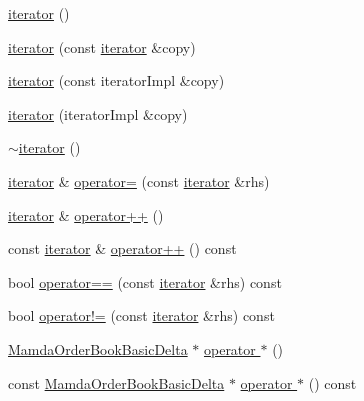 \begin{CompactItemize}
\item 
\hyperlink{classWombat_1_1MamdaOrderBookBasicDeltaList_1_1iterator_2b2b16d57802c922600386fa686529ec}{iterator} ()
\item 
\hyperlink{classWombat_1_1MamdaOrderBookBasicDeltaList_1_1iterator_73285ba98b5f3ee8cd067cd2f01b10ee}{iterator} (const \hyperlink{classWombat_1_1MamdaOrderBookBasicDeltaList_1_1iterator}{iterator} \&copy)
\item 
\hyperlink{classWombat_1_1MamdaOrderBookBasicDeltaList_1_1iterator_f6e3a8ac5c81f77305f305d91d16f53b}{iterator} (const iterator\-Impl \&copy)
\item 
\hyperlink{classWombat_1_1MamdaOrderBookBasicDeltaList_1_1iterator_8f40d8726b8a81e2c93d4f6e8c44719d}{iterator} (iterator\-Impl \&copy)
\item 
\hyperlink{classWombat_1_1MamdaOrderBookBasicDeltaList_1_1iterator_977160e063f28b4ebf01ad083fe9b483}{$\sim$iterator} ()
\item 
\hyperlink{classWombat_1_1MamdaOrderBookBasicDeltaList_1_1iterator}{iterator} \& \hyperlink{classWombat_1_1MamdaOrderBookBasicDeltaList_1_1iterator_3311d1e01265f02affd0aae547619d26}{operator=} (const \hyperlink{classWombat_1_1MamdaOrderBookBasicDeltaList_1_1iterator}{iterator} \&rhs)
\item 
\hyperlink{classWombat_1_1MamdaOrderBookBasicDeltaList_1_1iterator}{iterator} \& \hyperlink{classWombat_1_1MamdaOrderBookBasicDeltaList_1_1iterator_5dee1005097b25c4243403590ebcee0a}{operator++} ()
\item 
const \hyperlink{classWombat_1_1MamdaOrderBookBasicDeltaList_1_1iterator}{iterator} \& \hyperlink{classWombat_1_1MamdaOrderBookBasicDeltaList_1_1iterator_38eda689f28fc11edf74914cd5f3d8fb}{operator++} () const 
\item 
bool \hyperlink{classWombat_1_1MamdaOrderBookBasicDeltaList_1_1iterator_a676b915cb2c61128a0ef3f12deb72f9}{operator==} (const \hyperlink{classWombat_1_1MamdaOrderBookBasicDeltaList_1_1iterator}{iterator} \&rhs) const 
\item 
bool \hyperlink{classWombat_1_1MamdaOrderBookBasicDeltaList_1_1iterator_80c1e77e88b58eb571d26da4a5077043}{operator!=} (const \hyperlink{classWombat_1_1MamdaOrderBookBasicDeltaList_1_1iterator}{iterator} \&rhs) const 
\item 
\hyperlink{classWombat_1_1MamdaOrderBookBasicDelta}{Mamda\-Order\-Book\-Basic\-Delta} $\ast$ \hyperlink{classWombat_1_1MamdaOrderBookBasicDeltaList_1_1iterator_3a40012e2b1f16993dddf355fedf813f}{operator $\ast$} ()
\item 
const \hyperlink{classWombat_1_1MamdaOrderBookBasicDelta}{Mamda\-Order\-Book\-Basic\-Delta} $\ast$ \hyperlink{classWombat_1_1MamdaOrderBookBasicDeltaList_1_1iterator_2b68319ccb7b07e7606e06c5a603415c}{operator $\ast$} () const 
\end{CompactItemize}
